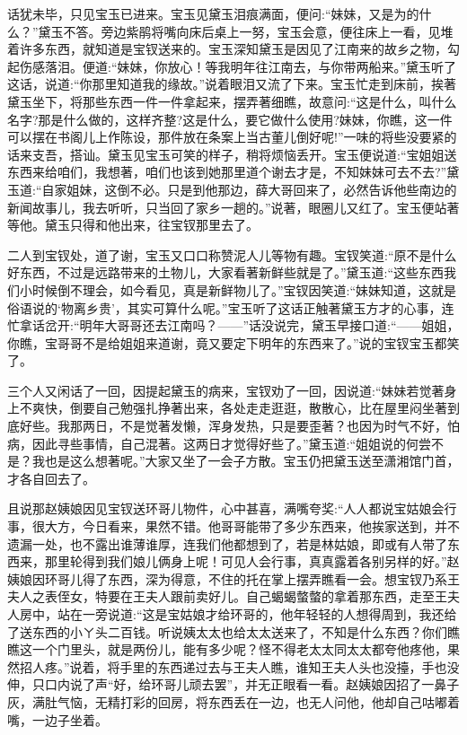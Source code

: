 \begin{parag}
    话犹未毕，只见宝玉已进来。宝玉见黛玉泪痕满面，便问:“妹妹，又是为的什么？”黛玉不答。旁边紫鹃将嘴向床后桌上一努，宝玉会意，便往床上一看，见堆着许多东西，就知道是宝钗送来的。宝玉深知黛玉是因见了江南来的故乡之物，勾起伤感落泪。便道:“妹妹，你放心！等我明年往江南去，与你带两船来。”黛玉听了这话，说道:“你那里知道我的缘故。”说着眼泪又流了下来。宝玉忙走到床前，挨著黛玉坐下，将那些东西一件一件拿起来，摆弄著细瞧，故意问:“这是什么，叫什么名字?那是什么做的，这样齐整?这是什么，要它做什么使用?妹妹，你瞧，这一件可以摆在书阁儿上作陈设，那件放在条案上当古董儿倒好呢!”一味的将些没要紧的话来支吾，搭讪。黛玉见宝玉可笑的样子，稍将烦恼丢开。宝玉便说道:“宝姐姐送东西来给咱们，我想著，咱们也该到她那里道个谢去才是，不知妹妹可去不去?”黛玉道:“自家姐妹，这倒不必。只是到他那边，薛大哥回来了，必然告诉他些南边的新闻故事儿，我去听听，只当回了家乡一趟的。”说著，眼圈儿又红了。宝玉便站著等他。黛玉只得和他出来，往宝钗那里去了。
\end{parag}


\begin{parag}
    二人到宝钗处，道了谢，宝玉又口口称赞泥人儿等物有趣。宝钗笑道:“原不是什么好东西，不过是远路带来的土物儿，大家看著新鲜些就是了。”黛玉道:“这些东西我们小时候倒不理会，如今看见，真是新鲜物儿了。”宝钗因笑道:“妹妹知道，这就是俗语说的‘物离乡贵’，其实可算什么呢。”宝玉听了这话正触著黛玉方才的心事，连忙拿话岔开:“明年大哥哥还去江南吗？——”话没说完，黛玉早接口道:“——姐姐，你瞧，宝哥哥不是给姐姐来道谢，竟又要定下明年的东西来了。”说的宝钗宝玉都笑了。
\end{parag}


\begin{parag}
    三个人又闲话了一回，因提起黛玉的病来，宝钗劝了一回，因说道:“妹妹若觉著身上不爽快，倒要自己勉强扎挣著出来，各处走走逛逛，散散心，比在屋里闷坐著到底好些。我那两日，不是觉著发懒，浑身发热，只是要歪著？也因为时气不好，怕病，因此寻些事情，自己混著。这两日才觉得好些了。”黛玉道:“姐姐说的何尝不是？我也是这么想著呢。”大家又坐了一会子方散。宝玉仍把黛玉送至潇湘馆门首，才各自回去了。
\end{parag}


\begin{parag}
    且说那赵姨娘因见宝钗送环哥儿物件，心中甚喜，满嘴夸奖:“人人都说宝姑娘会行事，很大方，今日看来，果然不错。他哥哥能带了多少东西来，他挨家送到，并不遗漏一处，也不露出谁薄谁厚，连我们他都想到了，若是林姑娘，即或有人带了东西来，那里轮得到我们娘儿俩身上呢！可见人会行事，真真露着各别另样的好。”赵姨娘因环哥儿得了东西，深为得意，不住的托在掌上摆弄瞧看一会。想宝钗乃系王夫人之表侄女，特要在王夫人跟前卖好儿。自己蝎蝎螫螫的拿着那东西，走至王夫人房中，站在一旁说道:“这是宝姑娘才给环哥的，他年轻轻的人想得周到，我还给了送东西的小ㄚ头二百钱。听说姨太太也给太太送来了，不知是什么东西？你们瞧瞧这一个门里头，就是两份儿，能有多少呢？怪不得老太太同太太都夸他疼他，果然招人疼。”说着，将手里的东西递过去与王夫人瞧，谁知王夫人头也没擡，手也没伸，只口内说了声“好，给环哥儿顽去罢”，并无正眼看一看。赵姨娘因招了一鼻子灰，满肚气恼，无精打彩的回房，将东西丢在一边，也无人问他，他却自己咕嘟着嘴，一边子坐着。
\end{parag}


